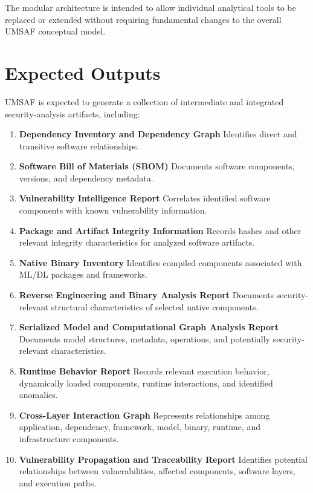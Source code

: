 \documentclass[
  12pt,
  letterpaper,
  oneside]{report}
\begin{document}
The modular architecture is intended to allow individual analytical
tools to be replaced or extended without requiring fundamental changes
to the overall UMSAF conceptual model.

\section{Expected Outputs}\label{107-expected-outputs}

UMSAF is expected to generate a collection of intermediate and
integrated security-analysis artifacts, including:

\begin{enumerate}
\def\labelenumi{\arabic{enumi}.}
\item
  \textbf{Dependency Inventory and Dependency Graph} Identifies direct
  and transitive software relationships.
\item
  \textbf{Software Bill of Materials (SBOM)} Documents software
  components, versions, and dependency metadata.
\item
  \textbf{Vulnerability Intelligence Report} Correlates identified
  software components with known vulnerability information.
\item
  \textbf{Package and Artifact Integrity Information} Records hashes and
  other relevant integrity characteristics for analyzed software
  artifacts.
\item
  \textbf{Native Binary Inventory} Identifies compiled components
  associated with ML/DL packages and frameworks.
\item
  \textbf{Reverse Engineering and Binary Analysis Report} Documents
  security-relevant structural characteristics of selected native
  components.
\item
  \textbf{Serialized Model and Computational Graph Analysis Report}
  Documents model structures, metadata, operations, and potentially
  security-relevant characteristics.
\item
  \textbf{Runtime Behavior Report} Records relevant execution behavior,
  dynamically loaded components, runtime interactions, and identified
  anomalies.
\item
  \textbf{Cross-Layer Interaction Graph} Represents relationships among
  application, dependency, framework, model, binary, runtime, and
  infrastructure components.
\item
  \textbf{Vulnerability Propagation and Traceability Report} Identifies
  potential relationships between vulnerabilities, affected components,
  software layers, and execution paths.

\end{enumerate}
\end{document}
